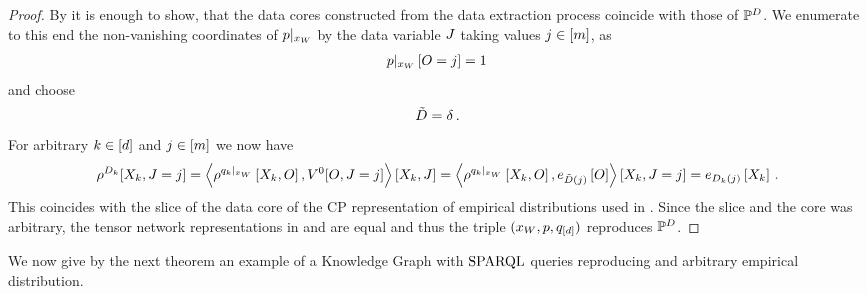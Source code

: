 \begin{proof}
    By  it is enough to show, that the data cores constructed from the data extraction process coincide with those of $\mathbb{P}^{D}$.
    We enumerate to this end the non-vanishing coordinates of ${p}|_{x_{W}}$ by the data variable $J$ taking values $j\in[m]$, as
    \begin{align*}
        {p}|_{x_{W}} \left[O=j\right] = 1 \,
    \end{align*}
    and choose
    \begin{align*}
        \tilde{D} = \delta \, .
    \end{align*}
    For arbitrary $k\in[d]$ and $j\in[m]$ we now have
    \begin{align*}
        \rho^{D_{k}}[X_{k},J=j]
        = \left\langle 
            \rho^{{q_{k}}|_{x_{W}}}\left[X_{k},O\right],
            V^{0}[O,J=j]
        \right\rangle \left[ X_{k},J \right]
        = \left\langle 
            \rho^{{q_{k}}|_{x_{W}}}\left[X_{k},O\right],
            e_{\tilde{D}(j)}\left[O\right]
        \right\rangle \left[ X_{k},J=j \right]
        = e_{D_k(j)}\left[X_{k}\right] \, .
    \end{align*}
    This coincides with the slice of the data core of the CP representation of empirical distributions used in .
    Since the slice and the core was arbitrary, the tensor network representations in  and  are equal and thus the triple $(x_{W},p,q_{[d]})$ reproduces $\mathbb{P}^{D}$.
\end{proof}


We now give by the next theorem an example of a Knowledge Graph with $\mathrm{SPARQL}$ queries reproducing and arbitrary empirical distribution.

